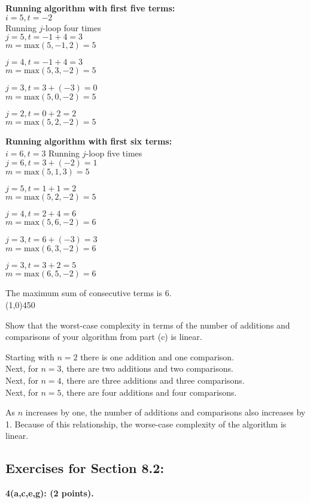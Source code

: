 \documentclass[12pt]{article}  %
\begin{document}
\noindent
\textbf{Running algorithm with first five terms:}\\
$i=5,t=-2$\\
Running $j$-loop four times\\
$j=5,t=-1+4=3$\\
$m=\textrm{max}(5,-1,2)=5$

\noindent
$j=4,t=-1+4=3$\\
$m=\textrm{max}(5,3,-2)=5$

\noindent
$j=3,t=3+(-3)=0$\\
$m=\textrm{max}(5,0,-2)=5$

\noindent
$j=2,t=0+2=2$\\
$m=\textrm{max}(5,2,-2)=5$

\noindent
\textbf{Running algorithm with first six terms:}\\
$i=6,t=3$
Running $j$-loop five times\\
$j=6,t=3+(-2)=1$\\
$m=\textrm{max}(5,1,3)=5$

\noindent
$j=5,t=1+1=2$\\
$m=\textrm{max}(5,2,-2)=5$

\noindent
$j=4,t=2+4=6$\\
$m=\textrm{max}(5,6,-2)=6$

\noindent
$j=3,t=6+(-3)=3$\\
$m=\textrm{max}(6,3,-2)=6$

\noindent
$j=3,t=3+2=5$\\
$m=\textrm{max}(6,5,-2)=6$

\noindent
The maximum sum of consecutive terms is 6.\\
\line(1,0){450}

\noindent
Show that the worst-case complexity in terms of the number of additions and comparisons of your algorithm from part (c) is linear.

\noindent
Starting with $n=2$ there is one addition and one comparison.\\
Next, for $n=3$, there are two additions and two comparisons.\\
Next, for $n=4$, there are three additions and three comparisons.\\
Next, for $n=5$, there are four additions and four comparisons.

\noindent
As $n$ increases by one, the number of additions and comparisons also increases by 1. Because of this relationship, the worse-case complexity of the algorithm is linear.

\clearpage
\subsection*{Exercises for Section 8.2:}     
\noindent
{\bf 4(a,c,e,g): (2 points).}
\end{document}
